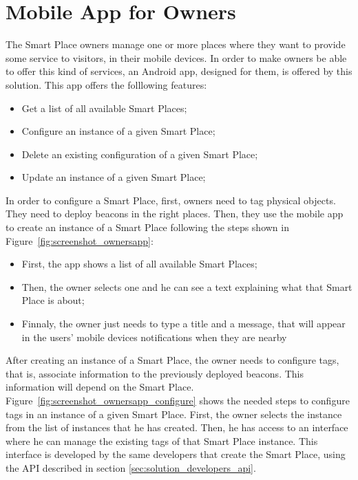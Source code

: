 \section{Mobile App for Owners}
\label{sec:solution_mobile_app_for_owners}
The Smart Place owners manage one or more places where they want to provide some service to visitors, in their mobile devices.
In order to make owners be able to offer this kind of services, an Android app, designed for them, is offered by this solution.
This app offers the folllowing features:
\begin{itemize}
  \item Get a list of all available Smart Places;
  \item Configure an instance of a given Smart Place;
  \item Delete an existing configuration of a given Smart Place;
  \item Update an instance of a given Smart Place;
\end{itemize}

In order to configure a Smart Place, first, owners need to tag physical objects.
They need to deploy beacons in the right places.
Then, they use the mobile app to create an instance of a Smart Place following the steps shown in Figure~\ref{fig:screenshot_ownersapp}:
\begin{itemize}
  \item First, the app shows a list of all available Smart Places;
  \item Then, the owner selects one and he can see a text explaining what that Smart Place is about;
  \item Finnaly, the owner just needs to type a title and a message, that will appear in the users' mobile devices notifications when they are nearby
\end{itemize}

After creating an instance of a Smart Place, the owner needs to configure tags, that is, associate information to the previously deployed beacons.
This information will depend on the Smart Place.
Figure~\ref{fig:screenshot_ownersapp_configure} shows the needed steps to configure tags in an instance of a given Smart Place.
First, the owner selects the instance from the list of instances that he has created.
Then, he has access to an interface where he can manage the existing tags of that Smart Place instance.
This interface is developed by the same developers that create the Smart Place, using the \gls{API} described in section \ref{sec:solution_developers_api}.

